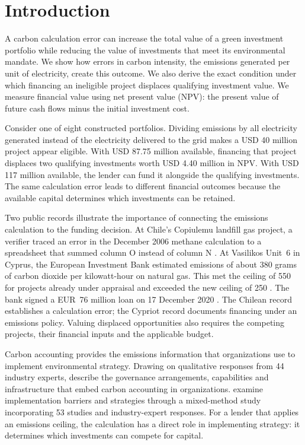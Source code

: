 \section{Introduction}
A carbon calculation error can increase the total value of a green investment portfolio while reducing the value of investments that meet its environmental mandate. We show how errors in carbon intensity, the emissions generated per unit of electricity, create this outcome. We also derive the exact condition under which financing an ineligible project displaces qualifying investment value. We measure financial value using net present value (NPV): the present value of future cash flows minus the initial investment cost.

Consider one of eight constructed portfolios. Dividing emissions by all electricity generated instead of the electricity delivered to the grid makes a USD 40 million project appear eligible. With USD 87.75 million available, financing that project displaces two qualifying investments worth USD 4.40 million in NPV. With USD 117 million available, the lender can fund it alongside the qualifying investments. The same calculation error leads to different financial outcomes because the available capital determines which investments can be retained.

Two public records illustrate the importance of connecting the emissions calculation to the funding decision. At Chile's Copiulemu landfill gas project, a verifier traced an error in the December 2006 methane calculation to a spreadsheet that summed column O instead of column N \citep[p.~11]{sgs}. At Vasilikos Unit~6 in Cyprus, the European Investment Bank estimated emissions of about 380 grams of carbon dioxide per kilowatt-hour on natural gas. This met the ceiling of 550 for projects already under appraisal and exceeded the new ceiling of 250 \citep{eibscore,eibmid}. The bank signed a EUR~76 million loan on 17 December 2020 \citep{eibloan}. The Chilean record establishes a calculation error; the Cypriot record documents financing under an emissions policy. Valuing displaced opportunities also requires the competing projects, their financial inputs and the applicable budget.

Carbon accounting provides the emissions information that organizations use to implement environmental strategy. Drawing on qualitative responses from 44 industry experts, \citet{ruan2026} describe the governance arrangements, capabilities and infrastructure that embed carbon accounting in organizations. \citet{wu2026} examine implementation barriers and strategies through a mixed-method study incorporating 53 studies and industry-expert responses. For a lender that applies an emissions ceiling, the calculation has a direct role in implementing strategy: it determines which investments can compete for capital.

